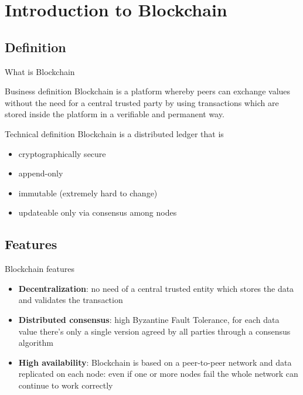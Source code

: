 \documentclass{beamer}
\begin{document}
  \section{Introduction to Blockchain}
  \subsection{Definition}

  \begin{frame}{What is Blockchain}
    \begin{block}{Business definition}
      Blockchain is a platform whereby peers can exchange values without the need
      for a central trusted party by using transactions which are stored inside
      the platform in a verifiable and permanent way.
    \end{block}
    
    \pause
    \begin{block}{Technical definition}
      Blockchain is a distributed ledger that is
      \begin{itemize}
        \item cryptographically secure
        \item append-only
        \item immutable (extremely hard to change)
        \item updateable only via consensus among nodes
      \end{itemize}
    \end{block}
  \end{frame}



  \subsection{Features}
  \begin{frame}{Blockchain features}
    \begin{itemize}
      \item \textbf{Decentralization}: no need of a central trusted entity
      which stores the data and validates the transaction \pause
      \item \textbf{Distributed consensus}: high Byzantine Fault
      Tolerance, for each data value there's only a single version agreed by all
      parties through a consensus algorithm \pause
      \item \textbf{High availability}: Blockchain is based on a peer-to-peer
      network and data replicated on each node: even if one or more nodes fail
      the whole network can continue to work correctly
    \end{itemize}
  \end{frame}
\end{document}

